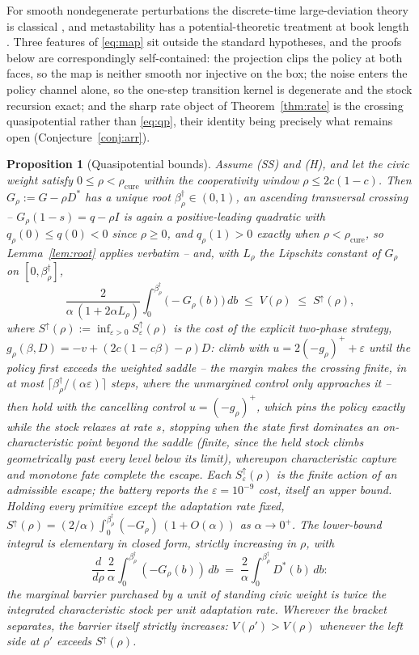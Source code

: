 \documentclass[11pt]{article}
\newtheorem{proposition}[theorem]{Proposition}
\theoremstyle{definition}
\theoremstyle{remark}
\numberwithin{equation}{section}
\begin{document}
For smooth nondegenerate perturbations the discrete-time large-deviation theory is classical \citep{kifer1988random, freidlin2012random}, and metastability has a potential-theoretic treatment at book length \citep{bovier2015metastability}. Three features of \eqref{eq:map} sit outside the standard hypotheses, and the proofs below are correspondingly self-contained: the projection clips the policy at both faces, so the map is neither smooth nor injective on the box; the noise enters the policy channel alone, so the one-step transition kernel is degenerate and the stock recursion exact; and the sharp rate object of Theorem~\ref{thm:rate} is the crossing quasipotential rather than \eqref{eq:qp}, their identity being precisely what remains open (Conjecture~\ref{conj:arr}).

\begin{proposition}[Quasipotential bounds]\label{prop:qpbounds}
Assume (SS) and (H), and let the civic weight satisfy $0 \le \rho < \rho_{\mathrm{cure}}$ within the cooperativity window $\rho \le 2c(1-c)$. Then $G_\rho := G - \rho D^\ast$ has a unique root $\beta^\dagger_\rho \in (0,1)$, an ascending transversal crossing -- $G_\rho(1-s) = q - \rho I$ is again a positive-leading quadratic with $q_\rho(0) \le q(0) < 0$ since $\rho \ge 0$, and $q_\rho(1) > 0$ exactly when $\rho < \rho_{\mathrm{cure}}$, so Lemma~\ref{lem:root} applies verbatim -- and, with $L_\rho$ the Lipschitz constant of $G_\rho$ on $[0, \beta^\dagger_\rho]$,
\[
\frac{2}{\alpha\,(1+2\alpha L_\rho)}\int_0^{\beta^\dagger_\rho}\bigl(-G_\rho(b)\bigr)\,db
\;\le\; V(\rho) \;\le\; S^{\uparrow}(\rho),
\]
where $S^{\uparrow}(\rho) := \inf_{\varepsilon > 0} S^{\uparrow}_\varepsilon(\rho)$ is the cost of the explicit two-phase strategy, $g_\rho(\beta, D) = -v + (2c(1-c\beta)-\rho)D$: \emph{climb} with $u = 2(-g_\rho)^+ + \varepsilon$ until the policy first exceeds the weighted saddle -- the margin makes the crossing finite, in at most $\lceil \beta^\dagger_\rho/(\alpha\varepsilon)\rceil$ steps, where the unmargined control only approaches it -- then \emph{hold} with the cancelling control $u = (-g_\rho)^+$, which pins the policy exactly while the stock relaxes at rate $s$, stopping when the state first dominates an on-characteristic point beyond the saddle (finite, since the held stock climbs geometrically past every level below its limit), whereupon characteristic capture and monotone fate complete the escape. Each $S^{\uparrow}_\varepsilon(\rho)$ is the finite action of an admissible escape; the battery reports the $\varepsilon = 10^{-9}$ cost, itself an upper bound. Holding every primitive except the adaptation rate fixed, $S^{\uparrow}(\rho) = (2/\alpha)\int_0^{\beta^\dagger_\rho}(-G_\rho)\,(1+O(\alpha))$ as $\alpha \to 0^+$. The lower-bound integral is elementary in closed form, strictly increasing in $\rho$, with
\[
\frac{d}{d\rho}\,\frac{2}{\alpha}\int_0^{\beta^\dagger_\rho}(-G_\rho(b))\,db \;=\; \frac{2}{\alpha}\int_0^{\beta^\dagger_\rho} D^\ast(b)\,db:
\]
the marginal barrier purchased by a unit of standing civic weight is twice the integrated characteristic stock per unit adaptation rate. Wherever the bracket separates, the barrier itself strictly increases: $V(\rho') > V(\rho)$ whenever the left side at $\rho'$ exceeds $S^{\uparrow}(\rho)$.
\end{proposition}
\end{document}
